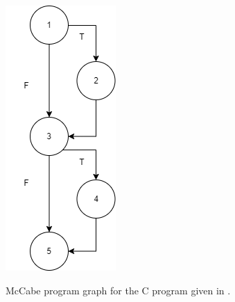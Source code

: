 \begin{marginfigure}[-21cm]
    \includegraphics{images/cfg-35.png}
    \caption{McCabe program graph for the C program given in .}
\end{marginfigure}
